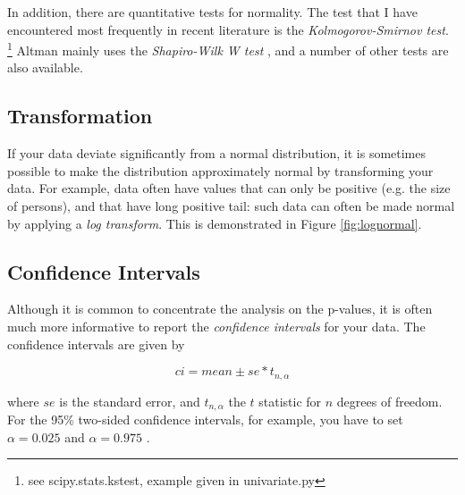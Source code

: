 In addition, there are quantitative tests for normality. The test that I have encountered most frequently in recent literature is the \emph{Kolmogorov-Smirnov test}.
\footnote{see scipy.stats.kstest, example given in univariate.py}
Altman mainly uses the \emph{Shapiro-Wilk W test} \cite{altman99}, and a number of other tests are also available.

\subsection{Transformation} 
If your data deviate significantly from a normal distribution, it is sometimes possible to make the distribution approximately normal by transforming your data. For example, data often have values that can only be positive (e.g. the size of persons), and that have  long positive tail: such data can often be made normal by applying a \emph{log transform}. This is demonstrated in Figure \ref{fig:lognormal}.

\subsection{Confidence Intervals}
Although it is common to concentrate the analysis on the p-values, it is often much more informative to report the \emph{confidence intervals} for your data. The confidence intervals are given by

\begin{equation}
  ci = mean \pm se * t_{n,\alpha}
\end{equation}

where $se$ is the standard error, and $t_{n,\alpha}$ the $t$ statistic for $n$ degrees of freedom. For the 95\% two-sided confidence intervals, for example, you have to set $\alpha=0.025$ and $\alpha=0.975$ .
